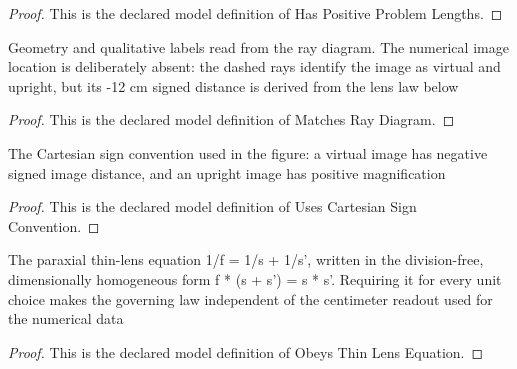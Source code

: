 \begin{proof}
  This is the declared model definition of Has Positive Problem Lengths.
\end{proof}
\begin{definition}
  \label{def:physics:phyx-mini-0052:phyxminiproblems-problemphyxmini0052-matchesraydiagram}
  Geometry and qualitative labels read from the ray diagram. The numerical image location is deliberately absent: the dashed rays identify the image as virtual and upright, but its -12 cm signed distance is derived from the lens law below
\end{definition}
\begin{proof}
  This is the declared model definition of Matches Ray Diagram.
\end{proof}
\begin{definition}
  \label{def:physics:phyx-mini-0052:phyxminiproblems-problemphyxmini0052-usescartesiansignconvention}
  The Cartesian sign convention used in the figure: a virtual image has negative signed image distance, and an upright image has positive magnification
\end{definition}
\begin{proof}
  This is the declared model definition of Uses Cartesian Sign Convention.
\end{proof}
\begin{definition}
  \label{def:physics:phyx-mini-0052:phyxminiproblems-problemphyxmini0052-obeysthinlensequation}
  The paraxial thin-lens equation 1/f = 1/s + 1/s', written in the division-free, dimensionally homogeneous form f * (s + s') = s * s'. Requiring it for every unit choice makes the governing law independent of the centimeter readout used for the numerical data
\end{definition}
\begin{proof}
  This is the declared model definition of Obeys Thin Lens Equation.
\end{proof}
